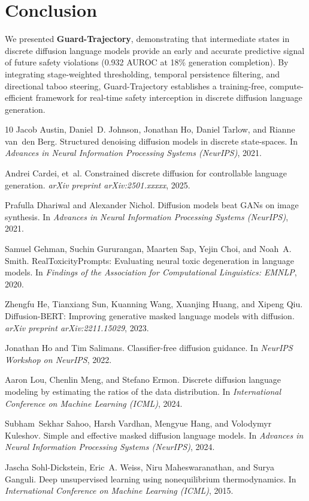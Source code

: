 \documentclass[11pt]{article}
\begin{document}
\section{Conclusion}
We presented \textbf{Guard-Trajectory}, demonstrating that intermediate states in discrete diffusion language models provide an early and accurate predictive signal of future safety violations (0.932 AUROC at 18\% generation completion). By integrating stage-weighted thresholding, temporal persistence filtering, and directional taboo steering, Guard-Trajectory establishes a training-free, compute-efficient framework for real-time safety interception in discrete diffusion language generation.

\begin{thebibliography}{10}
Jacob Austin, Daniel~D. Johnson, Jonathan Ho, Daniel Tarlow, and Rianne van~den Berg.
\newblock Structured denoising diffusion models in discrete state-spaces.
\newblock In \emph{Advances in Neural Information Processing Systems (NeurIPS)}, 2021.

Andrei Cardei, et~al.
\newblock Constrained discrete diffusion for controllable language generation.
\newblock \emph{arXiv preprint arXiv:2501.xxxxx}, 2025.

Prafulla Dhariwal and Alexander Nichol.
\newblock Diffusion models beat GANs on image synthesis.
\newblock In \emph{Advances in Neural Information Processing Systems (NeurIPS)}, 2021.

Samuel Gehman, Suchin Gururangan, Maarten Sap, Yejin Choi, and Noah~A. Smith.
\newblock RealToxicityPrompts: Evaluating neural toxic degeneration in language models.
\newblock In \emph{Findings of the Association for Computational Linguistics: EMNLP}, 2020.

Zhengfu He, Tianxiang Sun, Kuanning Wang, Xuanjing Huang, and Xipeng Qiu.
\newblock Diffusion-BERT: Improving generative masked language models with diffusion.
\newblock \emph{arXiv preprint arXiv:2211.15029}, 2023.

Jonathan Ho and Tim Salimans.
\newblock Classifier-free diffusion guidance.
\newblock In \emph{NeurIPS Workshop on NeurIPS}, 2022.

Aaron Lou, Chenlin Meng, and Stefano Ermon.
\newblock Discrete diffusion language modeling by estimating the ratios of the data distribution.
\newblock In \emph{International Conference on Machine Learning (ICML)}, 2024.

Subham~Sekhar Sahoo, Harsh Vardhan, Mengyue Hang, and Volodymyr Kuleshov.
\newblock Simple and effective masked diffusion language models.
\newblock In \emph{Advances in Neural Information Processing Systems (NeurIPS)}, 2024.

Jascha Sohl-Dickstein, Eric~A. Weiss, Niru Maheswaranathan, and Surya Ganguli.
\newblock Deep unsupervised learning using nonequilibrium thermodynamics.
\newblock In \emph{International Conference on Machine Learning (ICML)}, 2015.
\end{thebibliography}
\end{document}
